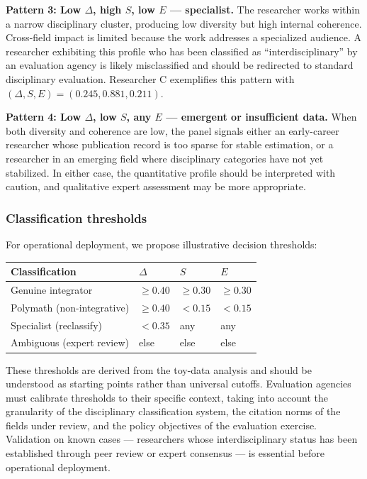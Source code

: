 \documentclass[
]{article}
\begin{document}
\textbf{Pattern 3: Low \(\Delta\), high \(S\), low \(E\) ---
specialist.} The researcher works within a narrow disciplinary cluster,
producing low diversity but high internal coherence. Cross-field impact
is limited because the work addresses a specialized audience. A
researcher exhibiting this profile who has been classified as
``interdisciplinary'' by an evaluation agency is likely misclassified
and should be redirected to standard disciplinary evaluation. Researcher
C exemplifies this pattern with
\((\Delta, S, E) = (0.245, 0.881, 0.211)\).

\textbf{Pattern 4: Low \(\Delta\), low \(S\), any \(E\) --- emergent or
insufficient data.} When both diversity and coherence are low, the panel
signals either an early-career researcher whose publication record is
too sparse for stable estimation, or a researcher in an emerging field
where disciplinary categories have not yet stabilized. In either case,
the quantitative profile should be interpreted with caution, and
qualitative expert assessment may be more appropriate.

\hypertarget{classification-thresholds}{%
\subsubsection{Classification
thresholds}\label{classification-thresholds}}

For operational deployment, we propose illustrative decision thresholds:

\begin{longtable}[]{@{}llll@{}}
\toprule
Classification & \(\Delta\) & \(S\) & \(E\) \\
\midrule
\endhead
Genuine integrator & \(\ge 0.40\) & \(\ge 0.30\) & \(\ge 0.30\) \\
Polymath (non-integrative) & \(\ge 0.40\) & \(< 0.15\) & \(< 0.15\) \\
Specialist (reclassify) & \(< 0.35\) & any & any \\
Ambiguous (expert review) & else & else & else \\
\bottomrule
\end{longtable}

These thresholds are derived from the toy-data analysis and should be
understood as starting points rather than universal cutoffs. Evaluation
agencies must calibrate thresholds to their specific context, taking
into account the granularity of the disciplinary classification system,
the citation norms of the fields under review, and the policy objectives
of the evaluation exercise. Validation on known cases --- researchers
whose interdisciplinary status has been established through peer review
or expert consensus --- is essential before operational deployment.
\end{document}
